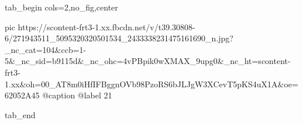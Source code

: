  
 
 
 
 


\ifcmt
  tab_begin cols=2,no_fig,center

     pic https://scontent-frt3-1.xx.fbcdn.net/v/t39.30808-6/271943511_5095320320501534_2433338231475161690_n.jpg?_nc_cat=104&ccb=1-5&_nc_sid=b9115d&_nc_ohc=4vPBpik0wXMAX_9upg0&_nc_ht=scontent-frt3-1.xx&oh=00_AT8m0iHfIFBggnOVb98PzoRS6bJLJgW3XCevT5pKS4uX1A&oe=62052A45
		 @caption @label 21

  tab_end
\fi
